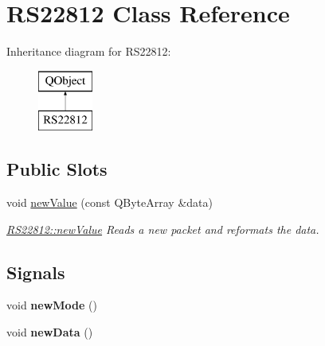 \hypertarget{classRS22812}{\section{R\-S22812 Class Reference}
\label{classRS22812}
}
Inheritance diagram for R\-S22812\-:\begin{figure}[H]
\begin{center}
\leavevmode
\includegraphics[height=2.000000cm]{classRS22812}
\end{center}
\end{figure}
\subsection*{Public Slots}
\begin{DoxyCompactItemize}
\item 
void \hyperlink{classRS22812_a5de59c9521bc80e37745c8c3243d9229}{new\-Value} (const Q\-Byte\-Array \&data)
\begin{DoxyCompactList}\small\item\em \hyperlink{classRS22812_a5de59c9521bc80e37745c8c3243d9229}{R\-S22812\-::new\-Value} Reads a new packet and reformats the data. \end{DoxyCompactList}\end{DoxyCompactItemize}
\subsection*{Signals}
\begin{DoxyCompactItemize}
\item 
\hypertarget{classRS22812_a47691c122c8ad0716dc7c86b1bf01bb8}{void {\bfseries new\-Mode} ()}\label{classRS22812_a47691c122c8ad0716dc7c86b1bf01bb8}

\item 
\hypertarget{classRS22812_afdbd28cc7f8abb95f13ad9d795c6c10d}{void {\bfseries new\-Data} ()}\label{classRS22812_afdbd28cc7f8abb95f13ad9d795c6c10d}

\end{DoxyCompactItemize}
